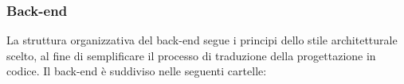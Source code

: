 \subsubsection{Back-end}



\par La struttura organizzativa del back-end segue i principi dello stile architetturale scelto, al fine di semplificare il processo di traduzione della progettazione in codice. Il back-end è suddiviso nelle seguenti cartelle:

\begin{minipage}{\textwidth}
\end{minipage}
